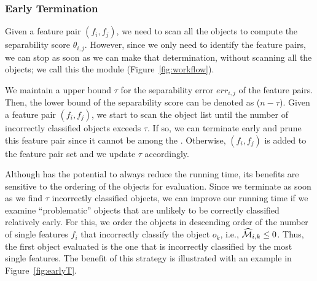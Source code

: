 \subsubsection{Early Termination} \label{ssec:earlyT}

Given a feature pair $(f_i,f_j)$,
we need to scan all the objects
to compute the separability score $\theta_{i,j}$.
However, since we only need to identify the \topk feature pairs,
we can stop as soon as we can make that determination, without
scanning all the objects; we call this the \earlyT module (Figure~\ref{fig:workflow}).

 We maintain a upper bound $\tau$
for the separability error $err_{i,j}$ of the \topk feature pairs.
Then, the lower bound of the separability
score can be denoted as ($n-\tau$).
Given a feature pair $(f_i,f_j)$, we start to scan the object list until the number of incorrectly classified objects exceeds $\tau$. If so, we can terminate early and prune this feature pair since it cannot be among the \topk.
Otherwise, $(f_i,f_j)$ is added to the \topk feature pair set and we update $\tau$ accordingly. 

Although \earlyT has the potential to always reduce the running time, its benefits are sensitive to the ordering of the objects for evaluation. Since we terminate as soon as we find $\tau$ incorrectly classified objects, we can improve our running time if we examine ``problematic'' objects that are unlikely to be correctly classified relatively early.
For this,
we order the objects in descending order of
the number of single features $f_i$ that incorrectly
classify the object $o_k$, i.e., $\widehat{{\mathcal{M}}}_{i,k}\leq0$.
Thus, the first object evaluated is the one that is incorrectly
classified by the most single features. The benefit of this strategy is illustrated with an example in Figure~\ref{fig:earlyT}.



